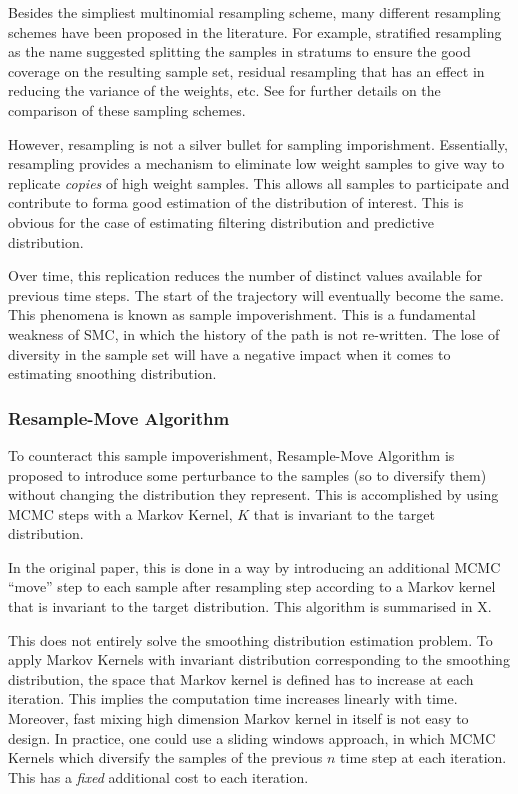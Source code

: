 Besides the simpliest multinomial resampling scheme, many different resampling schemes have been proposed in the literature. For example, stratified resampling \cite{} as the name suggested splitting the samples in stratums to ensure the good coverage on the resulting sample set, residual resampling \cite{} that has an effect in reducing the variance of the weights, etc. See \cite{} for further details on the comparison of these sampling schemes.

However, resampling is not a silver bullet for sampling imporishment. Essentially, resampling provides a mechanism to eliminate low weight samples to give way to replicate \emph{copies} of high weight samples. This allows all samples to participate and contribute to forma  good estimation of the distribution of interest. This is obvious for the case of estimating filtering distribution and predictive distribution.

Over time, this replication reduces the number of distinct values available for previous time steps. The start of the trajectory will eventually become the same. This phenomena is known as sample impoverishment. This is a fundamental weakness of SMC, in which the history of the path is not re-written. The lose of diversity in the sample set will have a negative impact when it comes to estimating snoothing distribution.

\subsubsection{Resample-Move Algorithm}
To counteract this sample impoverishment, Resample-Move Algorithm \cite{} is proposed to introduce some perturbance to the samples (so to diversify them) without changing the distribution they represent. This is accomplished by using MCMC steps with a Markov Kernel, $K$ that is invariant to the target distribution.

In the original paper, this is done in a way by introducing an additional MCMC ``move'' step to each sample after resampling step according to a Markov kernel that is invariant to the target distribution. This algorithm is summarised in X.

This does not entirely solve the smoothing distribution estimation problem. To apply Markov Kernels with invariant distribution corresponding to the smoothing distribution, the space that Markov kernel is defined has to increase at each iteration. This implies the computation time increases linearly with time. Moreover, fast mixing high dimension Markov kernel in itself is not easy to design. In practice, one could use a sliding windows approach, in which MCMC Kernels which diversify the samples of the previous $n$ time step at each iteration. This has a \emph{fixed} additional cost to each iteration.

